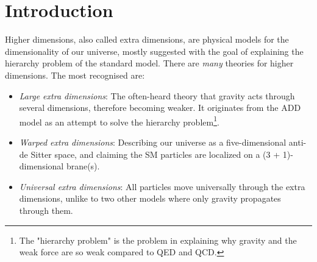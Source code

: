 \documentclass[11pt,a4paper]{article}
\begin{document}
\section{Introduction}
Higher dimensions, also called extra dimensions, are physical models for the dimensionality of our universe, mostly suggested with the goal of explaining the hierarchy problem of the standard model. There are \emph{many} theories for higher dimensions. The most recognised are:
\begin{itemize}
	\item \emph{Large extra dimensions}: The often-heard theory that gravity acts through several dimensions, therefore becoming weaker. It originates from the ADD model as an attempt to solve the hierarchy problem\footnote{The "hierarchy problem" is the problem in explaining why gravity and the weak force are so weak compared to QED and QCD.}.
	\item \emph{Warped extra dimensions}: Describing our universe as a five-dimensional anti-de Sitter space, and claiming the SM particles are localized on a (3 + 1)-dimensional brane(s).
	\item \emph{Universal extra dimensions}: All particles move universally through the extra dimensions, unlike to two other models where only gravity propagates through them.
\end{itemize}
\end{document}
